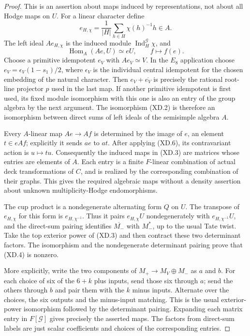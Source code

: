 \begin{proof}
This is an assertion about maps induced by representations, not
about all Hodge maps on \(U\).  For a linear character define
\[
 e_{H,\chi}=\frac1{|H|}\sum_{h\in H}\chi(h)^{-1}h\in A.
\]
The left ideal \(Ae_{H,\chi}\) is the induced module
\(\operatorname{Ind}_H^{\mathcal G}\chi\), and
\[
 \operatorname{Hom}_A(Ae,U)\simeq eU,\qquad
                     f\longmapsto f(e).                    \tag{XD.6}
\]
Choose a primitive idempotent \(e_V\) with \(Ae_V\simeq V\).
In the \(E_8\) application choose
\(e_V=\epsilon_V(1-s_1)/2\), where \(\epsilon_V\) is the
individual central idempotent for the chosen embedding of the
natural character.  Then \(e_V+\overline{e_V}\) is precisely
the rational root-line projector \(p\) used in the last map.
If another primitive idempotent is first used, its fixed
module isomorphism with this one is also an entry of the
group algebra by the next argument.
The isomorphism (XD.2) is therefore an isomorphism between direct
sums of left ideals of the semisimple algebra \(A\).

Every \(A\)-linear map \(Ae\to Af\) is determined by the image of
\(e\), an element \(t\in eAf\); explicitly it sends \(ae\) to \(at\).
After applying (XD.6), its contravariant action is \(u\mapsto tu\).
Consequently the induced maps in (XD.3) are matrices whose entries
are elements of \(A\).  Each entry is a finite \(F\)-linear
combination of actual deck transformations of \(C\), and is
realized by the corresponding combination of their graphs.
This gives the required algebraic maps without a density assertion
about unknown multiplicity-Hodge endomorphisms.

The cup product is a nondegenerate alternating form \(Q\) on \(U\).
The transpose of \(e_{H,\chi}\) for this form is
\(e_{H,\chi^{-1}}\).  Thus it pairs \(e_{H,\chi}U\)
nondegenerately with \(e_{H,\chi^{-1}}U\), and the direct-sum
pairing identifies \(\overline{M_-}\) with \(M_-^*\), up to the
usual Tate twist.  Take the top exterior power of (XD.3) and then
contract these two determinant factors.  The isomorphism and the
nondegenerate determinant pairing prove that (XD.4) is nonzero.

More explicitly, write the two components of
\(M_+\to M_V\oplus M_-\) as \(a\) and \(b\).  For each choice of
six of the \(6+k\) plus inputs, send those six through \(a\);
send the others through \(b\) and pair them with the \(k\) minus
inputs.  Alternate over the choices, the six outputs and the
minus-input matching.  This is the usual exterior-power
isomorphism followed by the determinant pairing.  Expanding
each matrix entry in \(F[\mathcal G]\) gives precisely the
asserted maps.  The factors from direct-sum labels are just
scalar coefficients and choices of the corresponding entries.


\end{proof}
